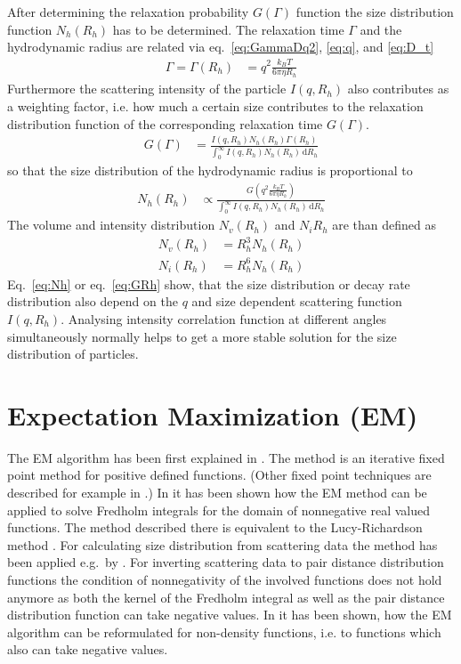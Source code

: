 After determining the relaxation probability $G(\Gamma)$ function the size distribution function $N_h(R_h)$ has to be determined. The relaxation time $\Gamma$ and the hydrodynamic radius are related via eq.\ \ref{eq:GammaDq2}, \ref{eq:q}, and \ref{eq:D_t}
\begin{align}
\Gamma = \Gamma(R_h)&= q^2 \frac{k_BT}{6\pi\eta R_h}
\end{align}
Furthermore  the scattering intensity of the particle $I(q,R_h)$ also contributes as a weighting factor, i.e. how much a certain size contributes to the relaxation distribution function of the corresponding relaxation time $G(\Gamma)$.
\begin{align}
\label{eq:GRh}
G(\Gamma) &= \frac{I(q,R_h) N_h(R_h) \Gamma(R_h)} {\int_0^\infty I(q,R_h) N_h(R_h) \, \mathrm{d}R_h}
\end{align}
so that the size distribution of the hydrodynamic radius is proportional to
\begin{align}
\label{eq:Nh}
N_h(R_h) &\propto  \frac{G\left(q^2 \frac{k_BT}{6\pi\eta R_h}\right)}{\int_0^\infty I(q,R_h) N_h(R_h) \, \mathrm{d}R_h}
\end{align}
The volume and intensity distribution $N_v(R_h)$ and $N_i{R_h}$ are than defined as
\begin{align}
N_v(R_h) &= R_h^3 N_h(R_h) \\
N_i(R_h) &= R_h^6 N_h(R_h)
\end{align}
Eq.\ \ref{eq:Nh} or eq.\ \ref{eq:GRh} show, that the size distribution or decay rate distribution also depend on the $q$ and size dependent scattering function $I(q,R_h)$. Analysing intensity correlation function at different angles simultaneously normally helps to get a more stable solution for the size distribution of particles.

\section{Expectation Maximization (EM)}
The EM algorithm has been first explained in \cite{Dempster1977}. The method is an iterative fixed point method for positive defined functions. (Other fixed point techniques are described for example in \cite{Hanke2000}.) In \cite{Vardi1993} it has been shown how the EM method can be applied to solve Fredholm integrals for the domain of nonnegative real valued functions. The method described there is equivalent to the Lucy\hyp{}Richardson method \cite{Richardson1972,Lucy1974}. For calculating size distribution from scattering data the method has been applied e.g.\ by \cite{Yang2013,Benvenuto2016,Benvenuto2017,Bakry2019}. For inverting scattering data to pair distance distribution functions the condition of nonnegativity of the involved functions does not hold anymore as both the kernel of the Fredholm integral as well as the pair distance distribution function can take negative values. In \cite{Chae2018} it has been shown, how the EM algorithm can be reformulated for non-density functions, i.e. to functions which also can take negative values.


